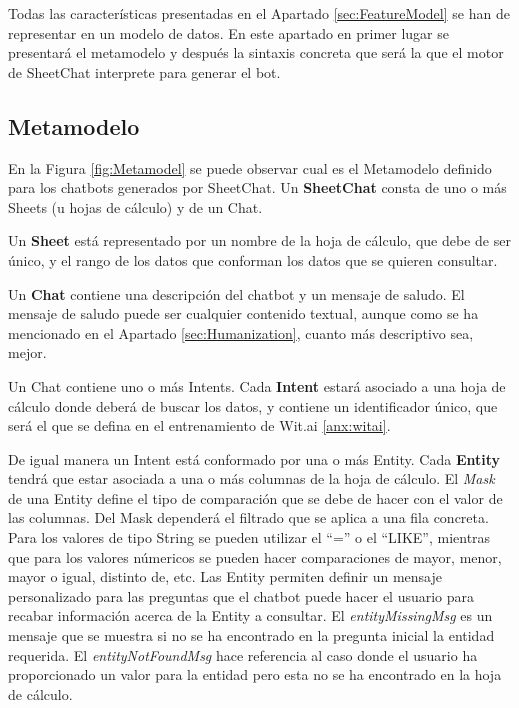 Todas las características presentadas en el Apartado \ref{sec:FeatureModel} se han de representar en un modelo de datos. En este apartado en primer lugar se presentará el metamodelo y después la sintaxis concreta que será la que el motor de SheetChat interprete para generar el bot.

\subsection{Metamodelo}
\label{sec:Metamodel}

En la Figura \ref{fig:Metamodel} se puede observar cual es el Metamodelo definido para los chatbots generados por SheetChat. Un \textbf{SheetChat} consta de uno o más Sheets (u hojas de cálculo) y de un Chat.

Un \textbf{Sheet} está representado por un nombre de la hoja de cálculo, que debe de ser único, y el rango de los datos que conforman los datos que se quieren consultar.

Un \textbf{Chat} contiene una descripción del chatbot y un mensaje de saludo. El mensaje de saludo puede ser cualquier contenido textual, aunque como se ha mencionado en el Apartado \ref{sec:Humanization}, cuanto más descriptivo sea, mejor.

Un Chat contiene uno o más Intents. Cada \textbf{Intent} estará asociado a una hoja de cálculo donde deberá de buscar los datos, y contiene un identificador único, que será el que se defina en el entrenamiento de Wit.ai \ref{anx:witai}.

De igual manera un Intent está conformado por una o más Entity. Cada \textbf{Entity} tendrá que estar asociada a una o más columnas de la hoja de cálculo. El \emph{Mask} de una Entity define el tipo de comparación que se debe de hacer con el valor de las columnas. Del Mask dependerá el filtrado que se aplica a una fila concreta. Para los valores de tipo String se pueden utilizar el ``='' o el ``LIKE'', mientras que para los valores númericos se pueden hacer comparaciones de mayor, menor, mayor o igual, distinto de, etc. Las Entity permiten definir un mensaje personalizado para las preguntas que el chatbot puede hacer el usuario para recabar información acerca de la Entity a consultar. El \emph{entityMissingMsg} es un mensaje que se muestra si no se ha encontrado en la pregunta inicial la entidad requerida. El \emph{entityNotFoundMsg} hace referencia al caso donde el usuario ha proporcionado un valor para la entidad pero esta no se ha encontrado en la hoja de cálculo.


